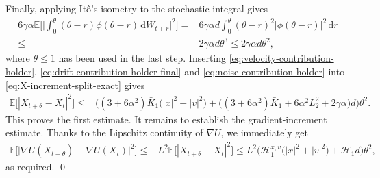 \documentclass[12pt]{article}
\numberwithin{equation}{section}
\renewenvironment{proof}%
  {\begin{trivlist}%
   \item[]\ignorespaces}%
  {\qed\end{trivlist}}
\newcommand{\dd}{\mathrm{d}}
\begin{document}
\begin{proof}
Finally, applying It\^o's isometry to the stochastic integral gives
\begin{equation}
\label{eq:noise-contribution-holder}
\begin{aligned}
6\gamma\alpha
\mathbb E
\Big[
\Big|
\int_0^\theta
(\theta-r)\phi(\theta-r)\,\dd W_{t+r}
\Big|^2
\Big]
=&
6\gamma\alpha d
\int_0^\theta
(\theta-r)^2|\phi(\theta-r)|^2\,\dd r
\\
\leq&
2\gamma\alpha d\theta^3
\leq
2\gamma\alpha d\theta^2,
\end{aligned}
\end{equation}
where $\theta\leq1$ has been used in the last step.
%
Inserting \eqref{eq:velocity-contribution-holder}, \eqref{eq:drift-contribution-holder-final} and \eqref{eq:noise-contribution-holder} into \eqref{eq:X-increment-split-exact} gives
\begin{equation}
\begin{aligned}
\mathbb E
\Big[
|X_{t+\theta}-X_t|^2
\Big]
\leq&
\Big(
(3+6\alpha^2)\bar K_1
\big(
|x|^2+|v|^2
\big)
+
\big(
(3+6\alpha^2)\bar K_1
+
6\alpha^2L_2^2
+
2\gamma\alpha
\big) d
\Big)\theta^2.
\end{aligned}
\end{equation}
This proves the first estimate.
%
It remains to establish the gradient-increment estimate. Thanks to the Lipschitz continuity of $\nabla U$, we immediately get
\begin{equation}
\begin{aligned}
\mathbb E
\Big[
\big|
\nabla U(X_{t+\theta})
-
\nabla U(X_t)
\big|^2
\Big]
\leq&
L^2
\mathbb E
\Big[
|X_{t+\theta}-X_t|^2
\Big]
\leq
L^2 \Big(
\mathscr H^{x,v}_1
\big(
|x |^2 
+
|v |^2
\big)
+
\mathscr H_1
d
\Big)
\theta^2,
\end{aligned}
\end{equation}
as required.
\end{proof}
\end{document}
